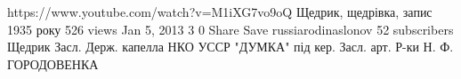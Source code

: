  
 
 
 
 

https://www.youtube.com/watch?v=M1iXG7vo9oQ
Щедрик, щедрівка, запис 1935 року
526 views
Jan 5, 2013
3
0
Share
Save
russiarodinaslonov
52 subscribers
Щедрик
Засл. Держ. капелла НКО УССР
"ДУМКА"
під кер. Засл. арт. Р-ки
Н. Ф. ГОРОДОВЕНКА
